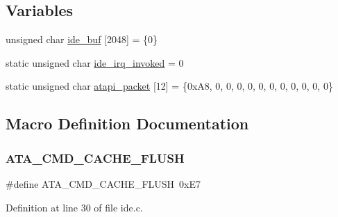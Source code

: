 \subsection*{Variables}
\begin{DoxyCompactItemize}
\item 
unsigned char \hyperlink{a00023_a94f78e77f368421e4fe8faea979d523f_a94f78e77f368421e4fe8faea979d523f}{ide\+\_\+buf} \mbox{[}2048\mbox{]} = \{0\}
\item 
static unsigned char \hyperlink{a00023_a12985ec2f925d0cdbd7d24728b9849f9_a12985ec2f925d0cdbd7d24728b9849f9}{ide\+\_\+irq\+\_\+invoked} = 0
\item 
static unsigned char \hyperlink{a00023_a02351861ecf3191d5dbbcc1910b7c109_a02351861ecf3191d5dbbcc1910b7c109}{atapi\+\_\+packet} \mbox{[}12\mbox{]} = \{0x\+A8, 0, 0, 0, 0, 0, 0, 0, 0, 0, 0, 0\}
\end{DoxyCompactItemize}


\subsection{Macro Definition Documentation}
\mbox{\label{a00023_a23e8deb17b95336898b52cc76d5206af_a23e8deb17b95336898b52cc76d5206af}} 
\subsubsection{\texorpdfstring{A\+T\+A\+\_\+\+C\+M\+D\+\_\+\+C\+A\+C\+H\+E\+\_\+\+F\+L\+U\+SH}{ATA\_CMD\_CACHE\_FLUSH}}
{\footnotesize\ttfamily \#define A\+T\+A\+\_\+\+C\+M\+D\+\_\+\+C\+A\+C\+H\+E\+\_\+\+F\+L\+U\+SH~0x\+E7}



Definition at line 30 of file ide.\+c.

\mbox{\label{a00023_a3c624c2041a51a473bd6e77b7753d475_a3c624c2041a51a473bd6e77b7753d475}} 
